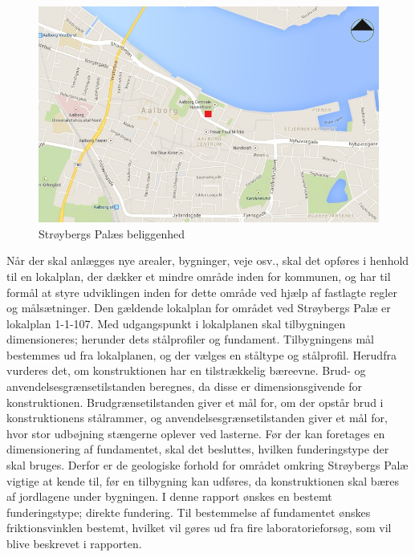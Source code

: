 \begin{figure}[htbp]
	\centering
	\includegraphics[width=1.0\textwidth]{billeder/aalborg.png}
	\caption{Strøybergs Palæs beliggenhed}
	\label{fig:aalborg}
\end{figure}

Når der skal anlægges nye arealer, bygninger, veje osv., skal det opføres i henhold til en lokalplan, der dækker et mindre område inden for kommunen, og har til formål at styre udviklingen inden for dette område ved hjælp af fastlagte regler og målsætninger. Den gældende lokalplan for området ved Strøybergs Palæ er lokalplan 1-1-107.
\newline
\newline
Med udgangspunkt i lokalplanen skal tilbygningen dimensioneres; herunder dets stålprofiler og fundament. 
\newline \indent{     }  Tilbygningens mål bestemmes ud fra lokalplanen, og der vælges en ståltype og stålprofil. Herudfra vurderes det, om konstruktionen har en tilstrækkelig bæreevne. Brud- og anvendelsesgrænsetilstanden beregnes, da disse er dimensionsgivende for konstruktionen. Brudgrænsetilstanden giver et mål for, om der opstår brud i konstruktionens stålrammer, og anvendelsesgrænsetilstanden giver et mål for, hvor stor udbøjning stængerne oplever ved lasterne.
\newline \indent{     }  Før der kan foretages en dimensionering af fundamentet, skal det besluttes, hvilken funderingstype der skal bruges. Derfor er de geologiske forhold for området omkring Strøybergs Palæ vigtige at kende til, før en tilbygning kan udføres, da konstruktionen skal bæres af jordlagene under bygningen. I denne rapport ønskes en bestemt funderingstype; direkte fundering. Til bestemmelse af fundamentet ønskes friktionsvinklen bestemt, hvilket vil gøres ud fra fire laboratorieforsøg, som vil blive beskrevet i rapporten.